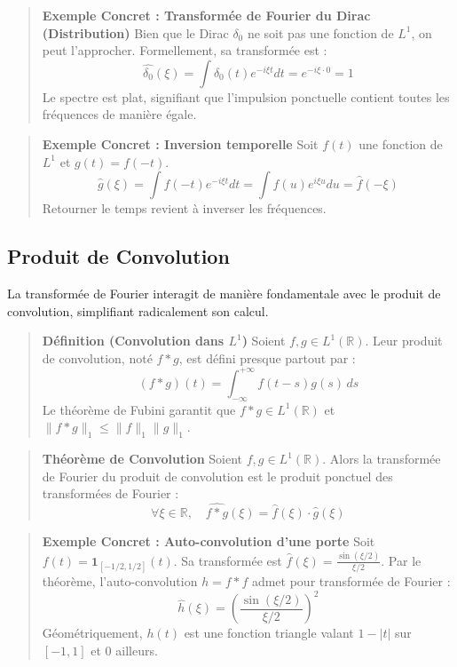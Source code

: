 \documentclass[11pt,a4paper]{article}
\begin{document}
\begin{quote}\textbf{Exemple Concret : Transformée de Fourier du Dirac (Distribution)}
Bien que le Dirac $\delta_0$ ne soit pas une fonction de $L^1$, on peut l'approcher. Formellement, sa transformée est :
$$ \hat{\delta_0}(\xi) = \int \delta_0(t) e^{-i\xi t} dt = e^{-i\xi \cdot 0} = 1 $$
Le spectre est plat, signifiant que l'impulsion ponctuelle contient toutes les fréquences de manière égale.\end{quote}

\begin{quote}\textbf{Exemple Concret : Inversion temporelle}
Soit $f(t)$ une fonction de $L^1$ et $g(t) = f(-t)$.
$$ \hat{g}(\xi) = \int f(-t) e^{-i\xi t} dt = \int f(u) e^{i\xi u} du = \hat{f}(-\xi) $$
Retourner le temps revient à inverser les fréquences.\end{quote}

\subsection{Produit de Convolution}

La transformée de Fourier interagit de manière fondamentale avec le produit de convolution, simplifiant radicalement son calcul.

\begin{quote}\textbf{Définition (Convolution dans $L^1$)}
Soient $f, g \in L^1(\mathbb{R})$. Leur produit de convolution, noté $f * g$, est défini presque partout par :
$$ (f * g)(t) = \int_{-\infty}^{+\infty} f(t-s)g(s) \, ds $$
Le théorème de Fubini garantit que $f * g \in L^1(\mathbb{R})$ et $\|f * g\|_1 \le \|f\|_1 \|g\|_1$.\end{quote}

\begin{quote}\textbf{Théorème de Convolution}
Soient $f, g \in L^1(\mathbb{R})$. Alors la transformée de Fourier du produit de convolution est le produit ponctuel des transformées de Fourier :
$$ \forall \xi \in \mathbb{R}, \quad \widehat{f * g}(\xi) = \hat{f}(\xi) \cdot \hat{g}(\xi) $$\end{quote}

\begin{quote}\textbf{Exemple Concret : Auto-convolution d'une porte}
Soit $f(t) = \mathbf{1}_{[-1/2, 1/2]}(t)$. Sa transformée est $\hat{f}(\xi) = \frac{\sin(\xi/2)}{\xi/2}$.
Par le théorème, l'auto-convolution $h = f * f$ admet pour transformée de Fourier :
$$ \hat{h}(\xi) = \left( \frac{\sin(\xi/2)}{\xi/2} \right)^2 $$
Géométriquement, $h(t)$ est une fonction triangle valant $1 - |t|$ sur $[-1, 1]$ et $0$ ailleurs.\end{quote}
\end{document}
